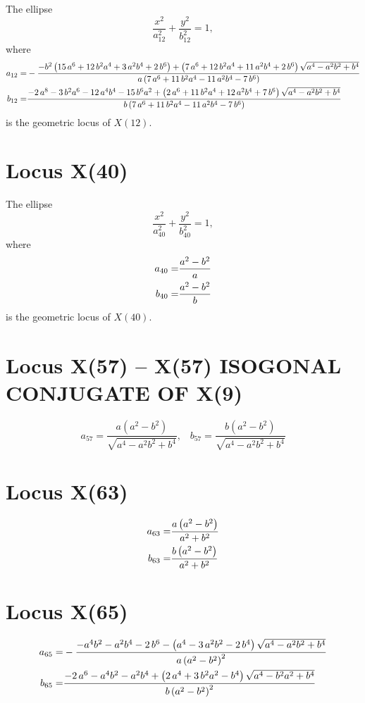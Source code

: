 \documentclass[11pt]{amsart}
\theoremstyle{plain}
\theoremstyle{definition}
\begin{document}
The ellipse \[ \frac{x^2}{a_{12}^2}+\frac{y^2}{b_{12}^2}=1, \]
where
\[\aligned 
a_{12}=&     -{\frac {-{b}^{2} \left( 15\,{a}^{6}+12\,{b}^{2}{a}^{4}+3\,{a}^{2}{b}^
		{4}+2\,{b}^{6} \right) + \left( 7\,{a}^{6}+12\,{b}^{2}{a}^{4}+11\,{a}^
		{2}{b}^{4}+2\,{b}^{6} \right) \sqrt {{a}^{4}-{a}^{2}{b}^{2}+{b}^{4}}}{
		a \left( 7\,{a}^{6}+11\,{b}^{2}{a}^{4}-11\,{a}^{2}{b}^{4}-7\,{b}^{6}
		\right) }}
%
\\
b_{12}=&  {\frac {-2\,{a}^{8}-3\,{b}^{2}{a}^{6}-12\,{a}^{4}{b}^{4}-15\,{b}^{6}{a
		}^{2}+ \left( 2\,{a}^{6}+11\,{b}^{2}{a}^{4}+12\,{a}^{2}{b}^{4}+7\,{b}^
		{6} \right) \sqrt {{a}^{4}-{a}^{2}{b}^{2}+{b}^{4}}}{b \left( 7\,{a}^{6
		}+11\,{b}^{2}{a}^{4}-11\,{a}^{2}{b}^{4}-7\,{b}^{6} \right) }}
%
%
\endaligned\] 
is the geometric locus of $X(12)$.




      \section{Locus X(40)}

The ellipse \[ \frac{x^2}{a_{40}^2}+\frac{y^2}{b_{40}^2}=1, \]
where
\[\aligned 
a_{40}=&    \frac { a^2-b^2}{a  }
\\
b_{40}=&  \frac { a^2-b^2}{b  }
%
\endaligned\] 
is the geometric locus of $X(40)$.
      
      
      
      \section{Locus X(57) -- 
      	X(57)  ISOGONAL CONJUGATE OF X(9)}
   \[   
     a_{57}=\frac{a (a^2- b^2)}{ \sqrt{ a^4-a^2 b^2+b^4}},\;\;\;
       b_{57}=\frac{b (a^2- b^2)}{ \sqrt{ a^4-a^2 b^2+b^4}}
     \]
     
          
     \section{Locus X(63) }
     \[   \aligned
     a_{ 63}=& {\frac {a \left( {a}^{2}-{b}^{2} \right) }{{a}^{2}+{b}^{2}}}\\
     b_{63}=& {\frac {b \left( {a}^{2}-{b}^{2} \right) }{{a}^{2}+{b}^{2}}}
     \endaligned
     \]
     
  
     
      \section{Locus X(65) }
    \[   \aligned
     a_{ 65}=&-{\frac {-{a}^{4}{b}^{2}-{a}^{2}{b}^{4}-2\,{b}^{6}- \left( {a}^{4}-3\,
     		{a}^{2}{b}^{2}-2\,{b}^{4} \right) \sqrt {{a}^{4}-{a}^{2}{b}^{2}+{b}^{4
     	}}}{a \left( a^2-b^2 \right)^{2}  }}\\
     b_{65}=&{\frac {-2\,{a}^{6}-{a}^{4}{b}^{2}-{a}^{2}{b}^{4}+ \left( 2\,{a}^{4}+3
     		\,{b}^{2}{a}^{2}-{b}^{4} \right) \sqrt {{a}^{4}-{b}^{2}{a}^{2}+{b}^{4}
     	}}{b \left( {a}^{2}-{b}^{2} \right) ^{2}}}
     \endaligned
     \]
\end{document}
